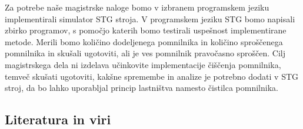 \documentclass[a4paper, 12pt]{article}
\begin{document}
Za potrebe naše magistrske naloge bomo v izbranem programskem jeziku implementirali simulator STG stroja. V programskem jeziku STG bomo napisali zbirko programov, s pomočjo katerih bomo testirali uspešnost implementirane metode. Merili bomo količino dodeljenega pomnilnika in količino sproščenega pomnilnika in skušali ugotoviti, ali je ves pomnilnik pravočasno sproščen. Cilj magistrskega dela ni izdelava učinkovite implementacije čiščenja pomnilnika, temveč skušati ugotoviti, kakšne spremembe in analize je potrebno dodati v STG stroj, da bo lahko uporabljal princip lastništva namesto čistilca pomnilnika.

\subsection{Literatura in viri}
\label{literatura}

\renewcommand\refname{}
\vspace{-50px}


\end{document}
